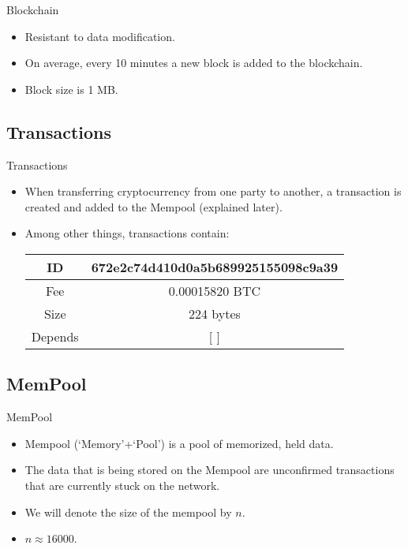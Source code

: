 \documentclass{beamer}
\begin{document}
\begin{frame}{Blockchain} %
    \begin{itemize}
        \item {Resistant to data modification.}
        \item {On average, every 10 minutes a new block is added to
        the blockchain.}
        \item {Block size is 1 MB.}
    \end{itemize}
\end{frame}
\subsection*{Transactions}

\begin{frame}{Transactions}
    \begin{itemize}
        \item {When transferring cryptocurrency from one party to another, 
        a transaction is created and added to the Mempool (explained 
        later).}
        \item {Among other things, transactions contain:}
        \begin{table}[]
            \centering
            \begin{tabular}{c|c}
                \hline
                ID & 672e2c74d410d0a5b689925155098c9a39 \\ 
                \hline
                Fee & 0.00015820 BTC \\
                \hline
                Size & 224 bytes \\
                \hline
                Depends & [ ] \\
                \hline
            \end{tabular}
            \label{tab:my_label3}
        \end{table}
    \end{itemize}
\end{frame}
\subsection*{MemPool}

\begin{frame}{MemPool}
    \begin{itemize}
        \item {Mempool (`Memory'+`Pool') is a 
        pool of memorized, held data.}
        \item {The data that is being stored on the Mempool are unconfirmed 
        transactions that are currently stuck on the network.}
        \item {We will denote the size of the mempool by $n$.}
        \item {$n \approx 16000$.}
    \end{itemize}
\end{frame}
\end{document}
